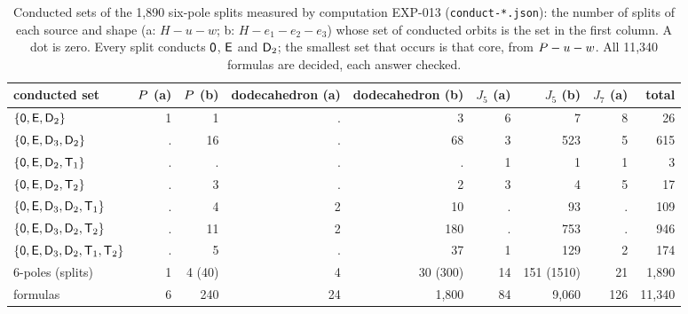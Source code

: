 \begin{table}[t]\centering\footnotesize
\setlength{\tabcolsep}{2.6pt}
\begin{tabular}{lrrrrrrrr}
\toprule
conducted set & $P$ (a) & $P$ (b) & dodecahedron (a) & dodecahedron (b) & $J_5$ (a) & $J_5$ (b) & $J_7$ (a) & total \\
\midrule
$\{\mathsf{0},\mathsf{E},\mathsf{D}_2\}$ & 1 & 1 & . & 3 & 6 & 7 & 8 & 26 \\
$\{\mathsf{0},\mathsf{E},\mathsf{D}_3,\mathsf{D}_2\}$ & . & 16 & . & 68 & 3 & 523 & 5 & 615 \\
$\{\mathsf{0},\mathsf{E},\mathsf{D}_2,\mathsf{T}_1\}$ & . & . & . & . & 1 & 1 & 1 & 3 \\
$\{\mathsf{0},\mathsf{E},\mathsf{D}_2,\mathsf{T}_2\}$ & . & 3 & . & 2 & 3 & 4 & 5 & 17 \\
$\{\mathsf{0},\mathsf{E},\mathsf{D}_3,\mathsf{D}_2,\mathsf{T}_1\}$ & . & 4 & 2 & 10 & . & 93 & . & 109 \\
$\{\mathsf{0},\mathsf{E},\mathsf{D}_3,\mathsf{D}_2,\mathsf{T}_2\}$ & . & 11 & 2 & 180 & . & 753 & . & 946 \\
$\{\mathsf{0},\mathsf{E},\mathsf{D}_3,\mathsf{D}_2,\mathsf{T}_1,\mathsf{T}_2\}$ & . & 5 & . & 37 & 1 & 129 & 2 & 174 \\
\midrule
6-poles (splits) & 1 & 4 (40) & 4 & 30 (300) & 14 & 151 (1510) & 21 & 1{,}890 \\
formulas & 6 & 240 & 24 & 1{,}800 & 84 & 9{,}060 & 126 & 11{,}340 \\
\bottomrule
\end{tabular}
\caption{Conducted sets of the 1{,}890 six-pole splits measured by computation EXP-013 (\texttt{conduct-*.json}): the number of splits of each source and shape (a: $H - u - w$; b: $H - e_1 - e_2 - e_3$) whose set of conducted orbits is the set in the first column. A dot is zero. Every split conducts $\mathsf{0}$, $\mathsf{E}$ and $\mathsf{D}_2$; the smallest set that occurs is that core, from $P - u - w$. All 11{,}340 formulas are decided, each answer checked.}\label{tab:splits}
\end{table}
